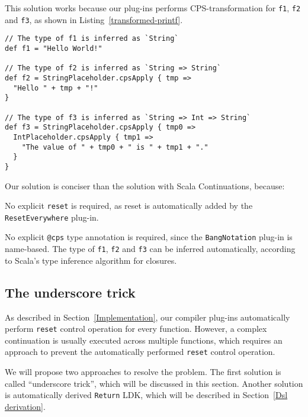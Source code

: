 This solution works because our plug-ins performs CPS-transformation for \lstinline{f1}, \lstinline{f2} and \lstinline{f3}, as shown in Listing~\ref{transformed-printf}.

\begin{lstlisting}[caption={The translated source code of \lstinline{Dsl.scala}-base solution of \lstinline{printf} problem},label={transformed-printf}]
// The type of f1 is inferred as `String`
def f1 = "Hello World!"

// The type of f2 is inferred as `String => String`
def f2 = StringPlaceholder.cpsApply { tmp =>
  "Hello " + tmp + "!"
}

// The type of f3 is inferred as `String => Int => String`
def f3 = StringPlaceholder.cpsApply { tmp0 =>
  IntPlaceholder.cpsApply { tmp1 =>
    "The value of " + tmp0 + " is " + tmp1 + "."
  }
}
\end{lstlisting}

Our solution is conciser than the solution with Scala Continuations, because:
\begin{enumerate*}
  \item No explicit \lstinline{reset} is required, as reset is automatically added by the \lstinline{ResetEverywhere} plug-in.
  \item No explicit \lstinline{@cps} type annotation is required, since the \lstinline{BangNotation} plug-in is name-based. The type of \lstinline{f1}, \lstinline{f2} and \lstinline{f3} can be inferred automatically, according to Scala's type inference algorithm for closures.
\end{enumerate*}

\subsection{The underscore trick}\label{The underscore trick}

As described in Section~\ref{Implementation}, our compiler plug-ins automatically perform \lstinline{reset} control operation for every function. However, a complex continuation is usually executed across multiple functions, which requires an approach to prevent the automatically performed \lstinline{reset} control operation.

We will propose two approaches to resolve the problem. The first solution is called ``underscore trick'', which will be discussed in this section. Another solution is automatically derived \lstinline{Return} LDK, which will be described in Section~\ref{Dsl derivation}.

